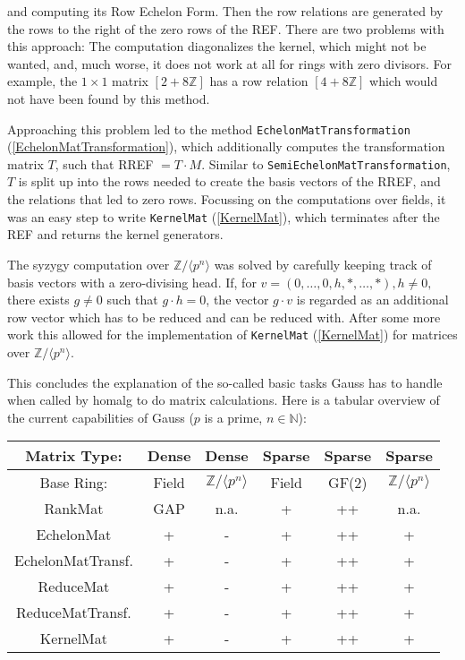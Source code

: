 \documentclass[a4paper,11pt]{report}
\begin{document}
{{ and computing its Row Echelon Form. Then the row relations are generated by
the rows to the right of the zero rows of the REF. There are two problems with
this approach: The computation diagonalizes the kernel, which might not be
wanted, and, much worse, it does not work at all for rings with zero divisors.
For example, the $1 \times 1$ matrix $[2 + 8{\ensuremath{\mathbb Z}}]$ has a row relation $[4 + 8{\ensuremath{\mathbb Z}}]$ which would not have been found by this method.

 Approaching this problem led to the method \texttt{EchelonMatTransformation} (\ref{EchelonMatTransformation}), which additionally computes the transformation matrix $T$, such that RREF $= T \cdot M$. Similar to \texttt{SemiEchelonMatTransformation}, $T$ is split up into the rows needed to create the basis vectors of the RREF, and
the relations that led to zero rows. Focussing on the computations over
fields, it was an easy step to write \texttt{KernelMat} (\ref{KernelMat}), which terminates after the REF and returns the kernel generators.

 The syzygy computation over ${\ensuremath{\mathbb Z}} / \langle p^n \rangle$ was solved by carefully keeping track of basis vectors with a zero-divising
head. If, for $ v = (0,\ldots,0,h,*,\ldots,*), h \neq 0,$ there exists $g \neq 0$ such that $g \cdot h = 0$, the vector $g \cdot v$ is regarded as an additional row vector which has to be reduced and can be
reduced with. After some more work this allowed for the implementation of \texttt{KernelMat} (\ref{KernelMat}) for matrices over ${\ensuremath{\mathbb Z}} / \langle p^n \rangle$.

 This concludes the explanation of the so-called basic tasks \textsf{Gauss} has to handle when called by \textsf{homalg} to do matrix calculations. Here is a tabular overview of the current
capabilities of \textsf{Gauss} ($p$ is a prime, $n \in {\ensuremath{\mathbb N}}$):

 \begin{center}
\begin{tabular}{|c||c|c|c|c|c|}\hline
Matrix Type:&
Dense&
Dense&
Sparse&
Sparse&
Sparse\\
\hline
Base Ring:&
Field&
${\ensuremath{\mathbb Z}} / \langle p^n \rangle$&
Field&
GF(2)&
${\ensuremath{\mathbb Z}} / \langle p^n \rangle$\\
\hline
\hline
RankMat&
\textsf{GAP}&
n.a.&
+&
++&
n.a.\\
\hline
EchelonMat&
+&
-&
+&
++&
+\\
\hline
EchelonMatTransf.&
+&
-&
+&
++&
+\\
\hline
ReduceMat&
+&
-&
+&
++&
+\\
\hline
ReduceMatTransf.&
+&
-&
+&
++&
+\\
\hline
KernelMat&
+&
-&
+&
++&
+\\
\hline
\end{tabular}\\[2mm]
\end{center}

}}
\end{document}
